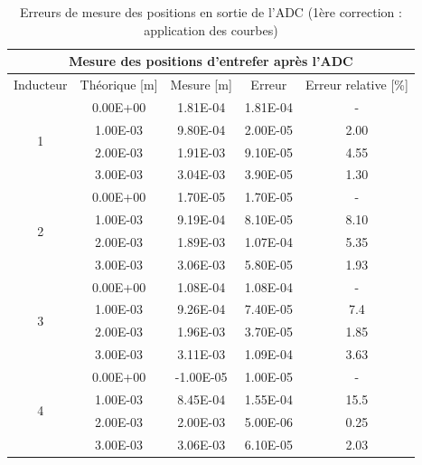 \begin{table}[H]
    \centering
    \begin{tabular}{|c|c|c|c|c|}
        \hline
        \multicolumn{5}{|c|}{\textbf{Mesure des positions d'entrefer après l'ADC}}                    \\ \hline
        Inducteur          & Théorique {[}m{]} & Mesure {[}m{]} & Erreur   & Erreur relative {[}\%{]} \\ \hline
        \multirow{4}{*}{1} & 0.00E+00          & 1.81E-04       & 1.81E-04 & -                        \\ \cline{2-5}
                           & 1.00E-03          & 9.80E-04       & 2.00E-05 & 2.00                     \\ \cline{2-5}
                           & 2.00E-03          & 1.91E-03       & 9.10E-05 & 4.55                     \\ \cline{2-5}
                           & 3.00E-03          & 3.04E-03       & 3.90E-05 & 1.30                     \\ \hline
        \multirow{4}{*}{2} & 0.00E+00          & 1.70E-05       & 1.70E-05 & -                        \\ \cline{2-5}
                           & 1.00E-03          & 9.19E-04       & 8.10E-05 & 8.10                     \\ \cline{2-5}
                           & 2.00E-03          & 1.89E-03       & 1.07E-04 & 5.35                     \\ \cline{2-5}
                           & 3.00E-03          & 3.06E-03       & 5.80E-05 & 1.93                     \\ \hline
        \multirow{4}{*}{3} & 0.00E+00          & 1.08E-04       & 1.08E-04 & -                        \\ \cline{2-5}
                           & 1.00E-03          & 9.26E-04       & 7.40E-05 & 7.4                      \\ \cline{2-5}
                           & 2.00E-03          & 1.96E-03       & 3.70E-05 & 1.85                     \\ \cline{2-5}
                           & 3.00E-03          & 3.11E-03       & 1.09E-04 & 3.63                     \\ \hline
        \multirow{4}{*}{4} & 0.00E+00          & -1.00E-05      & 1.00E-05 & -                        \\ \cline{2-5}
                           & 1.00E-03          & 8.45E-04       & 1.55E-04 & 15.5                     \\ \cline{2-5}
                           & 2.00E-03          & 2.00E-03       & 5.00E-06 & 0.25                     \\ \cline{2-5}
                           & 3.00E-03          & 3.06E-03       & 6.10E-05 & 2.03                     \\ \hline
    \end{tabular}
    \caption{Erreurs de mesure des positions en sortie de l'ADC (1ère correction : application des courbes)}
    \label{tab:correction1_adc}
\end{table}

